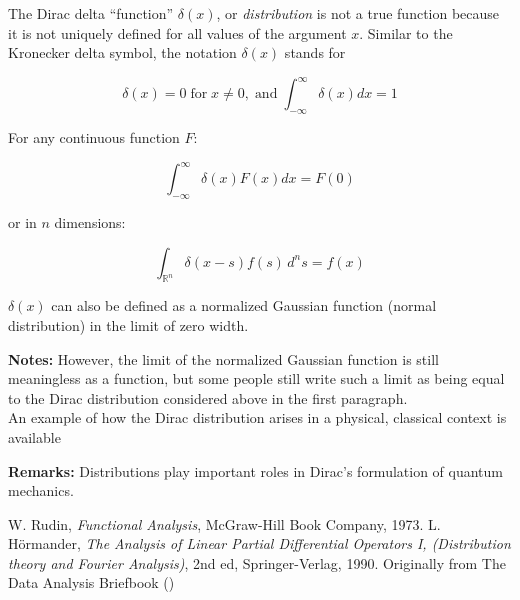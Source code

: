\documentclass{article}
\begin{document}
The Dirac delta ``function'' $\delta(x)$, or \emph{distribution} is not a true function because it is not uniquely defined for all values of the argument $x$. Similar to the Kronecker delta symbol, the notation $\delta(x)$ stands for

$$ \delta(x) = 0 \;\text{for}\; x \ne 0, \;\text{and}\; \int_{-\infty}^\infty \delta(x) dx = 1 $$

For any continuous function $F$:

$$ \int_{-\infty}^\infty \delta(x) F(x)dx = F(0) $$

or in $n$ dimensions:

$$\int_{\mathbb{R}^n} \delta(x - s)f(s) \, d^ns = f(x)$$

$\delta(x)$ can also be defined as a normalized Gaussian function (normal distribution) in the limit of zero width.

\textbf{Notes:}
However, the limit of the normalized Gaussian function is still meaningless as a function, but some people still write such a limit as being equal to the Dirac distribution considered above in the first paragraph. \\
An example of how the Dirac distribution arises in a physical, classical context is available 

{\bf Remarks:}
Distributions play important roles in Dirac's formulation of quantum mechanics.

\begin{thebibliography}{9}
W. Rudin, {\em Functional Analysis},
McGraw-Hill Book Company, 1973.
L. H\"ormander, {\em The Analysis of Linear Partial Differential Operators I,
(Distribution theory and Fourier Analysis)}, 2nd ed, Springer-Verlag, 1990.
Originally from The Data Analysis Briefbook
()
\end{thebibliography}
\end{document}
